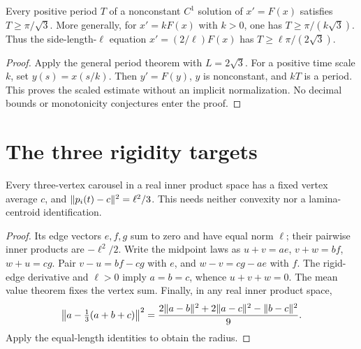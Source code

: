 \begin{proposition}
\label{prop:pentagon-period}
\leanok
{}
Every positive period $T$ of a nonconstant $C^1$ solution of $x'=F(x)$
satisfies $T\geq\pi/\sqrt3$. More generally, for $x'=kF(x)$ with $k>0$,
one has $T\geq\pi/(k\sqrt3)$. Thus the side-length-$\ell$ equation
$x'=(2/\ell)F(x)$ has $T\geq\ell\pi/(2\sqrt3)$.
\end{proposition}
\begin{proof}
\leanok
Apply the general period theorem with $L=2\sqrt3$.
For a positive time scale $k$, set $y(s)=x(s/k)$. Then $y'=F(y)$,
$y$ is nonconstant, and $kT$ is a period. This proves the scaled estimate
without an implicit normalization. No decimal bounds or monotonicity
conjectures enter the proof.
\end{proof}

\section{The three rigidity targets}

\begin{lemma}
\label{lem:triangle-carousel}
\leanok
{}
Every three-vertex carousel in a real inner product space has a fixed
vertex average $c$, and $\lVert p_i(t)-c\rVert^2=\ell^2/3$.
This needs neither convexity nor a lamina-centroid identification.
\end{lemma}
\begin{proof}
\leanok
Its edge vectors $e,f,g$ sum to zero and have equal norm $\ell$;
their pairwise inner products are $-\ell^2/2$.
Write the midpoint laws as $u+v=ae$, $v+w=bf$, $w+u=cg$.
Pair $v-u=bf-cg$ with $e$, and $w-v=cg-ae$ with $f$.
The rigid-edge derivative and $\ell>0$ imply $a=b=c$, whence
$u+v+w=0$. The mean value theorem fixes the vertex sum.
Finally, in any real inner product space,
\[
 \left\|a-\tfrac13(a+b+c)\right\|^2
 =\frac{2\lVert a-b\rVert^2+2\lVert a-c\rVert^2-\lVert b-c\rVert^2}{9}.
\]
Apply the equal-length identities to obtain the radius.
\end{proof}


